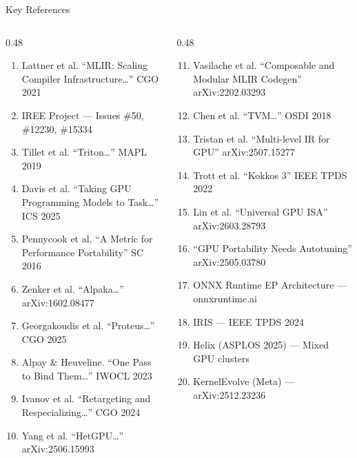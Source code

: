 \documentclass[aspectratio=169,10pt]{beamer}
\begin{document}
\begin{frame}{Key References}
  \begin{columns}[T]
    \begin{column}{0.48\textwidth}
      {\scriptsize
      \begin{enumerate}
        \item Lattner et al. ``MLIR: Scaling Compiler Infrastructure\ldots'' CGO 2021
        \item IREE Project --- Issues \#50, \#12230, \#15334
        \item Tillet et al. ``Triton\ldots'' MAPL 2019
        \item Davis et al. ``Taking GPU Programming Models to Task\ldots'' ICS 2025
        \item Pennycook et al. ``A Metric for Performance Portability'' SC 2016
        \item Zenker et al. ``Alpaka\ldots'' arXiv:1602.08477
        \item Georgakoudis et al. ``Proteus\ldots'' CGO 2025
        \item Alpay \& Heuveline. ``One Pass to Bind Them\ldots'' IWOCL 2023
        \item Ivanov et al. ``Retargeting and Respecializing\ldots'' CGO 2024
        \item Yang et al. ``HetGPU\ldots'' arXiv:2506.15993
      \end{enumerate}
      }
    \end{column}
    \begin{column}{0.48\textwidth}
      {\scriptsize
      \begin{enumerate}\setcounter{enumi}{10}
        \item Vasilache et al. ``Composable and Modular MLIR Codegen'' arXiv:2202.03293
        \item Chen et al. ``TVM\ldots'' OSDI 2018
        \item Tristan et al. ``Multi-level IR for GPU'' arXiv:2507.15277
        \item Trott et al. ``Kokkos 3'' IEEE TPDS 2022
        \item Lin et al. ``Universal GPU ISA'' arXiv:2603.28793
        \item ``GPU Portability Needs Autotuning'' arXiv:2505.03780
        \item ONNX Runtime EP Architecture --- onnxruntime.ai
        \item IRIS --- IEEE TPDS 2024
        \item Helix (ASPLOS 2025) --- Mixed GPU clusters
        \item KernelEvolve (Meta) --- arXiv:2512.23236
      \end{enumerate}
      }
    \end{column}
  \end{columns}
\end{frame}
\end{document}
